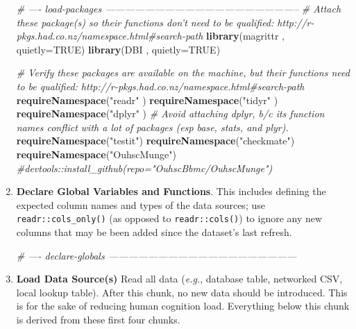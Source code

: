 \documentclass[]{book}
\newenvironment{Shaded}{\begin{snugshade}}{\end{snugshade}}
\newcommand{\CommentTok}[1]{\textcolor[rgb]{0.56,0.35,0.01}{\textit{#1}}}
\newcommand{\DataTypeTok}[1]{\textcolor[rgb]{0.13,0.29,0.53}{#1}}
\newcommand{\KeywordTok}[1]{\textcolor[rgb]{0.13,0.29,0.53}{\textbf{#1}}}
\newcommand{\NormalTok}[1]{#1}
\newcommand{\OtherTok}[1]{\textcolor[rgb]{0.56,0.35,0.01}{#1}}
\newcommand{\StringTok}[1]{\textcolor[rgb]{0.31,0.60,0.02}{#1}}
\begin{document}
\begin{enumerate}
\begin{Shaded}
\begin{Highlighting}[]
\CommentTok{# ---- load-packages -----------------------------------------------------------}
\CommentTok{# Attach these package(s) so their functions don't need to be qualified: http://r-pkgs.had.co.nz/namespace.html#search-path}
\KeywordTok{library}\NormalTok{(magrittr            , }\DataTypeTok{quietly=}\OtherTok{TRUE}\NormalTok{)}
\KeywordTok{library}\NormalTok{(DBI                 , }\DataTypeTok{quietly=}\OtherTok{TRUE}\NormalTok{)}

\CommentTok{# Verify these packages are available on the machine, but their functions need to be qualified: http://r-pkgs.had.co.nz/namespace.html#search-path}
\KeywordTok{requireNamespace}\NormalTok{(}\StringTok{"readr"}\NormalTok{        )}
\KeywordTok{requireNamespace}\NormalTok{(}\StringTok{"tidyr"}\NormalTok{        )}
\KeywordTok{requireNamespace}\NormalTok{(}\StringTok{"dplyr"}\NormalTok{        ) }\CommentTok{# Avoid attaching dplyr, b/c its function names conflict with a lot of packages (esp base, stats, and plyr).}
\KeywordTok{requireNamespace}\NormalTok{(}\StringTok{"testit"}\NormalTok{)}
\KeywordTok{requireNamespace}\NormalTok{(}\StringTok{"checkmate"}\NormalTok{)}
\KeywordTok{requireNamespace}\NormalTok{(}\StringTok{"OuhscMunge"}\NormalTok{) }\CommentTok{#devtools::install_github(repo="OuhscBbmc/OuhscMunge")}
\end{Highlighting}
\end{Shaded}
\item
  \textbf{Declare Global Variables and Functions}. This includes defining the expected column names and types of the data sources; use \texttt{readr::cols\_only()} (as opposed to \texttt{readr::cols()}) to ignore any new columns that may be been added since the dataset's last refresh.

\begin{Shaded}
\begin{Highlighting}[]
\CommentTok{# ---- declare-globals ---------------------------------------------------------}
\end{Highlighting}
\end{Shaded}
\item
  \textbf{Load Data Source(s)} Read all data (\emph{e.g.}, database table, networked CSV, local lookup table). After this chunk, no new data should be introduced. This is for the sake of reducing human cognition load. Everything below this chunk is derived from these first four chunks.


\end{enumerate}
\end{document}
